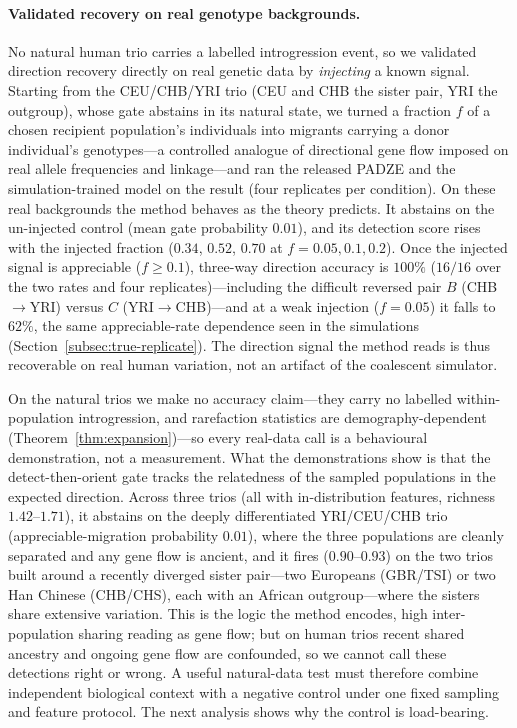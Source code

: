 \documentclass[11pt]{article}
\theoremstyle{plain}
\theoremstyle{definition}
\theoremstyle{remark}
\begin{document}
\paragraph{Validated recovery on real genotype backgrounds.} No natural human trio carries a
labelled introgression event, so we validated direction recovery directly on real genetic data by
\emph{injecting} a known signal. Starting from the CEU/CHB/YRI trio (CEU and CHB the sister pair,
YRI the outgroup), whose gate abstains in its natural state, we turned a fraction $f$ of a chosen
recipient population's individuals into migrants carrying a donor individual's genotypes---a
controlled analogue of directional gene flow imposed on real allele frequencies and linkage---and
ran the released \textsc{PADZE} and the simulation-trained model on the result (four replicates per
condition). On these real backgrounds the method behaves as the theory predicts. It abstains on the
un-injected control (mean gate probability $0.01$), and its detection score rises with the injected
fraction ($0.34$, $0.52$, $0.70$ at $f=0.05,0.1,0.2$). Once the injected signal is appreciable
($f\ge0.1$), three-way direction accuracy is $100\%$ ($16/16$ over the two rates and four
replicates)---including the difficult reversed pair $B$ (CHB$\to$YRI) versus $C$ (YRI$\to$CHB)---and
at a weak injection ($f=0.05$) it falls to $62\%$, the same appreciable-rate dependence seen in the
simulations (Section~\ref{subsec:true-replicate}). The direction signal the method reads is thus
recoverable on real human variation, not an artifact of the coalescent simulator.

On the natural trios we make no accuracy claim---they carry no labelled within-population introgression,
and rarefaction statistics are demography-dependent (Theorem~\ref{thm:expansion})---so every
real-data call is a behavioural demonstration, not a measurement. What the demonstrations show is
that the detect-then-orient gate tracks the relatedness of the sampled populations in the expected
direction. Across three trios (all with in-distribution features, richness $1.42$--$1.71$), it
abstains on the deeply differentiated YRI/CEU/CHB trio (appreciable-migration probability $0.01$),
where the three populations are cleanly separated and any gene flow is ancient, and it fires
($0.90$--$0.93$) on the two trios built around a recently diverged sister pair---two Europeans
(GBR/TSI) or two Han Chinese (CHB/CHS), each with an African outgroup---where the sisters share
extensive variation. This is the logic the method encodes, high inter-population sharing reading as
gene flow; but on human trios recent shared ancestry and ongoing gene flow are confounded, so we
cannot call these detections right or wrong. A useful natural-data test must therefore combine
independent biological context with a negative control under one fixed sampling and feature
protocol. The next analysis shows why the control is load-bearing.
\end{document}
